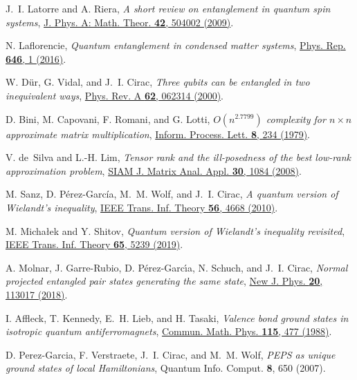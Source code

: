 \documentclass[english,11pt,aps,pra,onecolumn,tightenlines,groupedaddress,superscriptaddress,notitlepage,floatfix,fleqn]{revtex4-1}
\begin{document}
\begin{thebibliography}{10}
J.~I. Latorre and A. Riera, {\em A short review on entanglement in quantum spin
  systems}, \href{https://doi.org/10.1088/1751-8113/42/50/504002} {J. Phys. A:
  Math. Theor. {\bf 42},  504002  (2009)}.

N. Laflorencie, {\em Quantum entanglement in condensed matter systems},
  \href{https://doi.org/10.1016/j.physrep.2016.06.008} {Phys. Rep. {\bf 646},
  1   (2016)}.

W. D\"ur, G. Vidal, and J.~I. Cirac, {\em Three qubits can be entangled in two
  inequivalent ways}, \href{https://doi.org/10.1103/PhysRevA.62.062314} {Phys.
  Rev. A {\bf 62},  062314  (2000)}.

D. Bini, M. Capovani, F. Romani, and G. Lotti, {\em $O(n^{2.7799})$ complexity
  for $n\times n$ approximate matrix multiplication},
  \href{https://doi.org/10.1016/0020-0190(79)90113-3} {Inform. Process. Lett.
  {\bf 8},  234  (1979)}.

V. de~Silva and L.-H. Lim, {\em Tensor rank and the ill-posedness of the best
  low-rank approximation problem}, \href{https://doi.org/10.1137/06066518X}
  {SIAM J. Matrix Anal. Appl. {\bf 30},  1084  (2008)}.

M. Sanz, D. P\'{e}rez-Garc\'{i}a, M.~M. Wolf, and J.~I. Cirac, {\em A quantum
  version of Wielandt's inequality},
  \href{https://doi.org/10.1109/TIT.2010.2054552} {IEEE Trans. Inf. Theory {\bf
  56},  4668  (2010)}.

M. {Micha\l{}ek} and Y. {Shitov}, {\em Quantum version of Wielandt's inequality
  revisited}, \href{https://doi.org/10.1109/TIT.2019.2897772} {IEEE Trans. Inf.
  Theory {\bf 65},  5239  (2019)}.

A. Molnar, J. Garre-Rubio, D. P{\'{e}}rez-Garc{\'{\i}}a, N. Schuch, and J.~I.
  Cirac, {\em Normal projected entangled pair states generating the same
  state}, \href{https://doi.org/10.1088/1367-2630/aae9fa} {New J. Phys. {\bf
  20},  113017  (2018)}.

I. Affleck, T. Kennedy, E.~H. Lieb, and H. Tasaki, {\em Valence bond ground
  states in isotropic quantum antiferromagnets},
  \href{https://doi.org/10.1007/BF01218021} {Commun. Math. Phys. {\bf 115},
  477  (1988)}.

D. Perez-Garcia, F. Verstraete, J.~I. Cirac, and M.~M. Wolf, {\em PEPS as
  unique ground states of local Hamiltonians}, {Quantum Info. Comput. {\bf 8},
  650  (2007)}.


\end{thebibliography}
\end{document}
